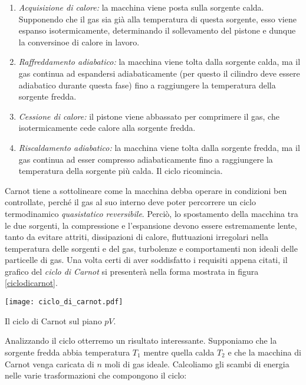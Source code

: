 \begin{enumerate}
    \item \textit{Acquisizione di calore:} la macchina viene posta sulla
    sorgente calda. Supponendo che il gas sia già alla temperatura di
    questa sorgente, esso viene espanso isotermicamente, determinando
    il sollevamento del pistone e dunque la conversinoe di calore in
    lavoro.

    \item \textit{Raffreddamento adiabatico:} la macchina viene tolta dalla
    sorgente calda, ma il gas continua ad espandersi adiabaticamente
    (per questo il cilindro deve essere adiabatico durante questa
    fase) fino a raggiungere la temperatura della sorgente fredda.

    \item \textit{Cessione di calore:} il pistone viene abbassato per
    comprimere il gas, che isotermicamente cede calore alla sorgente
    fredda.

    \item \textit{Riscaldamento adiabatico:} la macchina viene tolta dalla sorgente
    fredda, ma il gas continua ad esser compresso adiabaticamente fino
    a raggiungere la temperatura della sorgente più calda. Il ciclo
    ricomincia.
\end{enumerate}

Carnot tiene a sottolineare come la macchina debba operare in condizioni
ben controllate, perché il gas al suo interno deve poter percorrere un
ciclo termodinamico \textit{quasistatico reversibile}. Perciò, lo spostamento
della macchina tra le due sorgenti, la compressione e l'espansione devono
essere estremamente lente, tanto da evitare attriti, dissipazioni di
calore, fluttuazioni irregolari nella temperatura delle sorgenti e del gas,
turbolenze e comportamenti non ideali delle particelle di gas.
Una volta certi di aver soddisfatto i requisiti appena citati, il
grafico del \textit{ciclo di Carnot} si presenterà nella forma mostrata
in figura \ref{ciclodicarnot}.

\begin{marginfigure}
    \centering
    \texttt{[image: ciclo\_di\_carnot.pdf]}
    \caption{Il ciclo di Carnot sul piano $pV$.}
    \label{ciclodicarnot}
\end{marginfigure}



Analizzando il ciclo otterremo un risultato interessante.
Supponiamo che la sorgente fredda abbia temperatura $T_1$ mentre quella
calda $T_2$ e che la macchina di Carnot venga caricata di $n$ moli
di gas ideale. Calcoliamo gli scambi di energia nelle varie
trasformazioni che compongono il ciclo:


